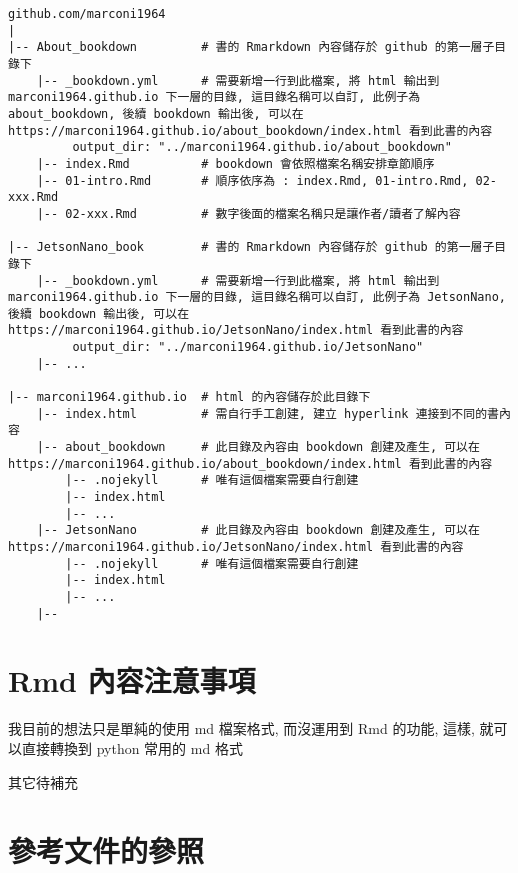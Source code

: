 \documentclass[
]{book}
\begin{document}
\begin{verbatim}
github.com/marconi1964
|
|-- About_bookdown         # 書的 Rmarkdown 內容儲存於 github 的第一層子目錄下
    |-- _bookdown.yml      # 需要新增一行到此檔案, 將 html 輸出到 marconi1964.github.io 下一層的目錄, 這目錄名稱可以自訂, 此例子為 about_bookdown, 後續 bookdown 輸出後, 可以在 https://marconi1964.github.io/about_bookdown/index.html 看到此書的內容 
         output_dir: "../marconi1964.github.io/about_bookdown"
    |-- index.Rmd          # bookdown 會依照檔案名稱安排章節順序
    |-- 01-intro.Rmd       # 順序依序為 : index.Rmd, 01-intro.Rmd, 02-xxx.Rmd
    |-- 02-xxx.Rmd         # 數字後面的檔案名稱只是讓作者/讀者了解內容
 
|-- JetsonNano_book        # 書的 Rmarkdown 內容儲存於 github 的第一層子目錄下
    |-- _bookdown.yml      # 需要新增一行到此檔案, 將 html 輸出到 marconi1964.github.io 下一層的目錄, 這目錄名稱可以自訂, 此例子為 JetsonNano, 後續 bookdown 輸出後, 可以在 https://marconi1964.github.io/JetsonNano/index.html 看到此書的內容
         output_dir: "../marconi1964.github.io/JetsonNano"
    |-- ...
    
|-- marconi1964.github.io  # html 的內容儲存於此目錄下
    |-- index.html         # 需自行手工創建, 建立 hyperlink 連接到不同的書內容
    |-- about_bookdown     # 此目錄及內容由 bookdown 創建及產生, 可以在 https://marconi1964.github.io/about_bookdown/index.html 看到此書的內容
        |-- .nojekyll      # 唯有這個檔案需要自行創建
        |-- index.html
        |-- ...
    |-- JetsonNano         # 此目錄及內容由 bookdown 創建及產生, 可以在 https://marconi1964.github.io/JetsonNano/index.html 看到此書的內容
        |-- .nojekyll      # 唯有這個檔案需要自行創建
        |-- index.html   
        |-- ...
    |--
\end{verbatim}

\hypertarget{rmd-ux5167ux5bb9ux6ce8ux610fux4e8bux9805}{%
\section{Rmd 內容注意事項}\label{rmd-ux5167ux5bb9ux6ce8ux610fux4e8bux9805}}

我目前的想法只是單純的使用 md 檔案格式, 而沒運用到 Rmd 的功能, 這樣, 就可以直接轉換到 python 常用的 md 格式

其它待補充

\hypertarget{ux53c3ux8003ux6587ux4ef6ux7684ux53c3ux7167}{%
\section{參考文件的參照}\label{ux53c3ux8003ux6587ux4ef6ux7684ux53c3ux7167}}
\end{document}
